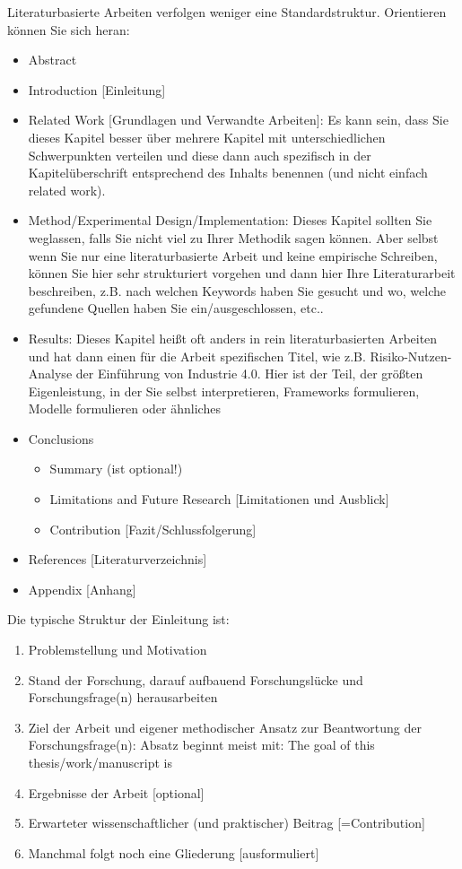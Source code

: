 Literaturbasierte Arbeiten verfolgen weniger eine Standardstruktur. Orientieren können Sie sich heran:
\begin{itemize}
  \item	Abstract
  \item Introduction [Einleitung]
  \item Related Work [Grundlagen und Verwandte Arbeiten]: Es kann sein, dass Sie dieses Kapitel besser über mehrere Kapitel mit unterschiedlichen Schwerpunkten verteilen und diese dann auch spezifisch in der Kapitelüberschrift entsprechend des Inhalts benennen (und nicht einfach related work).
  \item Method/Experimental Design/Implementation: Dieses Kapitel sollten Sie weglassen, falls Sie nicht viel zu Ihrer Methodik sagen können. Aber selbst wenn Sie nur eine literaturbasierte Arbeit und keine empirische Schreiben, können Sie hier sehr strukturiert vorgehen und dann hier Ihre Literaturarbeit beschreiben, z.B. nach welchen Keywords haben Sie gesucht und wo, welche gefundene Quellen haben Sie ein/ausgeschlossen, etc..
  \item Results: Dieses Kapitel heißt oft anders in rein literaturbasierten Arbeiten und hat dann einen für die Arbeit spezifischen Titel, wie z.B. Risiko-Nutzen-Analyse der Einführung von Industrie 4.0. Hier ist der Teil, der größten Eigenleistung, in der Sie selbst interpretieren, Frameworks formulieren, Modelle formulieren oder ähnliches
       \item Conclusions
  \begin{itemize}
    \item Summary (ist optional!)
    \item Limitations and Future Research [Limitationen und Ausblick]
     \item Contribution [Fazit/Schlussfolgerung]
   \end{itemize}
  \item References [Literaturverzeichnis]
  \item Appendix [Anhang]
\end{itemize}

Die typische Struktur der Einleitung ist:
\begin{enumerate}
  \item Problemstellung und Motivation
  \item Stand der Forschung, darauf aufbauend Forschungslücke und Forschungsfrage(n) herausarbeiten
  \item Ziel der Arbeit und eigener methodischer Ansatz zur Beantwortung der Forschungsfrage(n): Absatz beginnt meist mit: The goal of this thesis/work/manuscript is
  \item Ergebnisse der Arbeit [optional]
  \item Erwarteter wissenschaftlicher (und praktischer) Beitrag [=Contribution]
  \item Manchmal folgt noch eine Gliederung [ausformuliert]
\end{enumerate}

